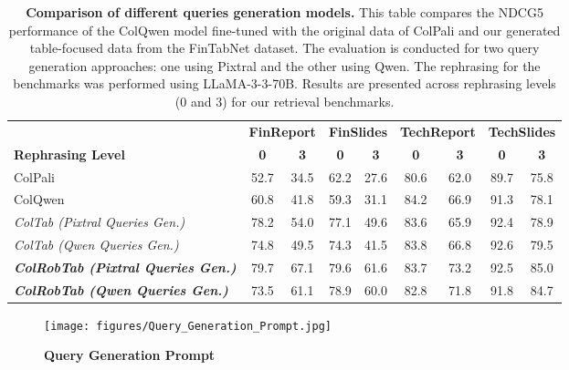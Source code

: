 \begin{table*}[t]
\footnotesize
\renewcommand{\arraystretch}{1.5} %
\setlength\tabcolsep{4pt} %
\caption{
\textbf{Comparison of different queries generation models.}
This table compares the NDCG5 performance of the ColQwen model fine-tuned with the original data of ColPali and our generated table-focused data from the FinTabNet dataset. The evaluation is conducted for two query generation approaches: one using Pixtral and the other using Qwen. The rephrasing for the benchmarks was performed using LLaMA-3-3-70B. Results are presented across rephrasing levels (0 and 3) for our retrieval benchmarks.}
\centering
\begin{tabular*}{1.03\linewidth}{@{\extracolsep{\fill}}l cc cc cc cc} 
\toprule
 & \multicolumn{2}{c}{\textbf{FinReport}} & \multicolumn{2}{c}{\textbf{FinSlides}} & \multicolumn{2}{c}{\textbf{TechReport}} & \multicolumn{2}{c}{\textbf{TechSlides}} \\
\textbf{Rephrasing Level} & \textbf{0} & \textbf{3} & \textbf{0} & \textbf{3} & \textbf{0} & \textbf{3} & \textbf{0} & \textbf{3} \\

\midrule
ColPali & 
52.7 & 34.5 &  
62.2 & 27.6 & 
80.6 & 62.0 & 
89.7 & 75.8 \\
ColQwen & 
60.8 & 41.8 & 
59.3 & 31.1 & 
84.2 & 66.9 & 
91.3 & 78.1 \\
\midrule
\emph{ColTab (Pixtral Queries Gen.)} & 
78.2 & 54.0 & 
77.1 & 49.6 & 
83.6 & 65.9 & 
92.4 & 78.9 \\

\emph{ColTab (Qwen Queries Gen.)} & 
74.8 & 49.5 & 
74.3 & 41.5 & 
83.8 & 66.8 & 
92.6 & 79.5 \\

\midrule
\emph{\textbf{ColRobTab (Pixtral Queries Gen.)}} & 
79.7 & 67.1 & 
79.6 & 61.6 & 
83.7 & 73.2 & 
92.5 & 85.0 \\

\emph{\textbf{ColRobTab (Qwen Queries Gen.)}} & 
73.5 & 61.1 & 
78.9 & 60.0 & 
82.8 & 71.8 & 
91.8 & 84.7 \\
\bottomrule
\end{tabular*}
\label{Table:VLM_ablation}
\end{table*}



\begin{figure*}[h!]
    \centering
    \texttt{[image: figures/Query\_Generation\_Prompt.jpg]} %
    \caption{\textbf{Query Generation Prompt}}
    \label{fig:query_generation_prompt} 
\end{figure*}

